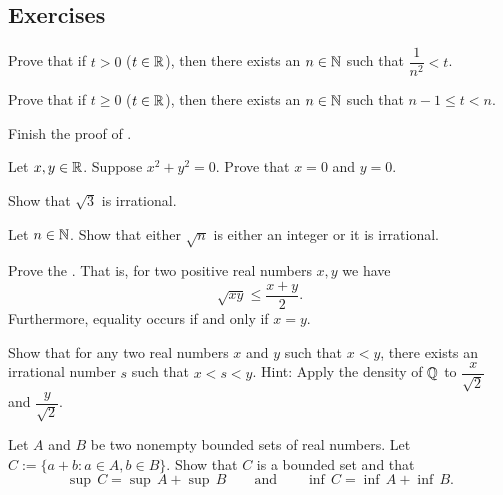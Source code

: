 \subsection{Exercises}

\begin{exercise}
Prove that
if $t > 0$ ($t \in {\mathbb{R}}$), then there exists an $n \in {\mathbb{N}}$ such that
$\dfrac{1}{n^2} < t$.
\end{exercise}

\begin{exercise}
Prove that
if $t \geq 0$ ($t \in {\mathbb{R}}$), then there exists an $n \in {\mathbb{N}}$ such that $n-1 \leq t < n$.
\end{exercise}

\begin{exercise}
Finish the proof of .
\end{exercise}

\begin{exercise}
Let $x, y \in {\mathbb{R}}$.  Suppose $x^2 + y^2 = 0$.  Prove that 
$x = 0$ and $y = 0$.
\end{exercise}

\begin{exercise}
Show that $\sqrt{3}$ is irrational.
\end{exercise}

\begin{exercise}
Let $n \in {\mathbb{N}}$.
Show that either $\sqrt{n}$ is either an integer or it is
irrational.
\end{exercise}

\begin{exercise}
Prove the \emph{}.  That is, 
for two positive real numbers $x,y$ we have
\begin{equation*}
\sqrt{xy} \leq \frac{x+y}{2} .
\end{equation*}
Furthermore, equality occurs if and only if $x=y$.
\end{exercise}

\begin{exercise}
Show that for any two real numbers $x$ and $y$ such that $x < y$, there
exists an irrational number $s$ such that $x < s < y$.  Hint:
Apply the density of ${\mathbb{Q}}$ to $\dfrac{x}{\sqrt{2}}$ and
$\dfrac{y}{\sqrt{2}}$.
\end{exercise}

\begin{exercise} \label{exercise:supofsum}
Let $A$ and $B$ be two nonempty bounded sets of real numbers.  Let
$C := \{ a+b : a \in A, b \in B \}$.
Show that $C$ is a bounded set and that
\begin{equation*}
\sup\,C = \sup\,A + \sup\,B 
\qquad \text{and} \qquad
\inf\,C = \inf\,A + \inf\,B .
\end{equation*}
\end{exercise}

